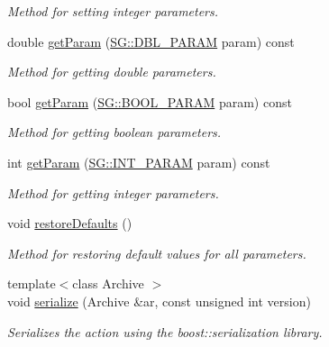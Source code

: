 \begin{DoxyCompactItemize}
\begin{DoxyCompactList}\small\item\em Method for setting integer parameters. \end{DoxyCompactList}\item 
\mbox{\label{classSGEnv_ae3b508ceaf8d9aec513dde852ba67579}} 
double \hyperlink{classSGEnv_ae3b508ceaf8d9aec513dde852ba67579}{get\+Param} (\hyperlink{namespaceSG_ac2f86c953fcec4419ac86538d9d314b6}{S\+G\+::\+D\+B\+L\+\_\+\+P\+A\+R\+AM} param) const
\begin{DoxyCompactList}\small\item\em Method for getting double parameters. \end{DoxyCompactList}\item 
\mbox{\label{classSGEnv_a13c98e1199f9a26375b525276650f954}} 
bool \hyperlink{classSGEnv_a13c98e1199f9a26375b525276650f954}{get\+Param} (\hyperlink{namespaceSG_a0b164afe6c58be3386d9e3f6e857b673}{S\+G\+::\+B\+O\+O\+L\+\_\+\+P\+A\+R\+AM} param) const
\begin{DoxyCompactList}\small\item\em Method for getting boolean parameters. \end{DoxyCompactList}\item 
\mbox{\label{classSGEnv_abf98a7ee14af5678e72577cdbc2d6fd3}} 
int \hyperlink{classSGEnv_abf98a7ee14af5678e72577cdbc2d6fd3}{get\+Param} (\hyperlink{namespaceSG_a031898e6fc0fa14d8590f85da9715f37}{S\+G\+::\+I\+N\+T\+\_\+\+P\+A\+R\+AM} param) const
\begin{DoxyCompactList}\small\item\em Method for getting integer parameters. \end{DoxyCompactList}\item 
\mbox{\label{classSGEnv_a77e0bf7bafe7b9d6da890ccd6d1db624}} 
void \hyperlink{classSGEnv_a77e0bf7bafe7b9d6da890ccd6d1db624}{restore\+Defaults} ()
\begin{DoxyCompactList}\small\item\em Method for restoring default values for all parameters. \end{DoxyCompactList}\item 
\mbox{\label{classSGEnv_abc39cb53702f831728fa577be5f09b97}} 
{\footnotesize template$<$class Archive $>$ }\\void \hyperlink{classSGEnv_abc39cb53702f831728fa577be5f09b97}{serialize} (Archive \&ar, const unsigned int version)
\begin{DoxyCompactList}\small\item\em Serializes the action using the boost\+::serialization library. \end{DoxyCompactList}\end{DoxyCompactItemize}
